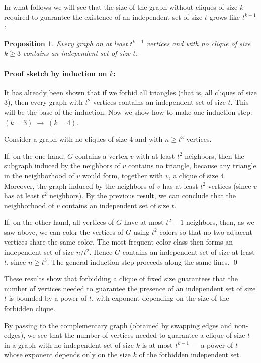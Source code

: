 \documentclass{amsart}
\newtheorem*{proposition}{Proposition}
\begin{document}
In what follows we will see that the size of the graph without cliques
of size $k$ required to guarantee the existence of an independent set
of size $t$ grows like $t^{k-1}$:
\begin{proposition}
  Every graph on at least $t^{k-1}$ vertices and with no clique of
  size $k\geq3$ contains an independent set of size $t$.
\end{proposition}
\paragraph{\textbf{Proof sketch by induction on $k$:}} It has already
been shown that if we forbid all triangles (that is, all cliques of
size $3$), then every graph with $t^2$ vertices contains an
independent set of size $t$. This will be the base of the
induction. Now we show how to make one induction step:
$(k=3)\;\to\;(k=4)$.

Consider a graph with no cliques of size $4$ and with $n\geq t^{3}$
vertices.

If, on the one hand, $G$ contains a vertex $v$ with at least $t^{2}$
neighbors, then the subgraph induced%
by the neighbors of $v$ contains no triangle, because any triangle in
the neighborhood of $v$ would form, together with $v$, a clique of
size $4$. Moreover, the graph induced by the neighbors of $v$ has at
least $t^{2}$ vertices (since $v$ has at least $t^{2}$ neighbors). By
the previous result, we can conclude that the neighborhood of $v$
contains an independent set of size $t$.

If, on the other hand, all vertices of $G$ have at most $t^{2}-1$
neighbors, then, as we saw above, we can color the vertices of $G$
using $t^{2}$ colors so that no two adjacent vertices share the same
color. The most frequent color class then forms an independent set of
size $n/t^{2}$. Hence $G$ contains an independent set of size at least
$t$, since $n\geq t^{3}$.
The general induction step proceeds along the same lines.
\hfill\qed
\smallskip

These results show that forbidding a clique of fixed size guarantees
that the number of vertices needed to guarantee the presence of an
independent set of size $t$ is bounded by a power of $t$, with
exponent depending on the size of the forbidden clique.

By passing to the complementary graph (obtained by swapping edges and
non-edges), we see that the number of vertices needed to guarantee
a clique of size $t$ in a graph with no independent
set of size $k$ is at most $t^{k-1}$ --- a power
of $t$ whose exponent depends only on the size $k$ of the forbidden
independent set.
\end{document}
